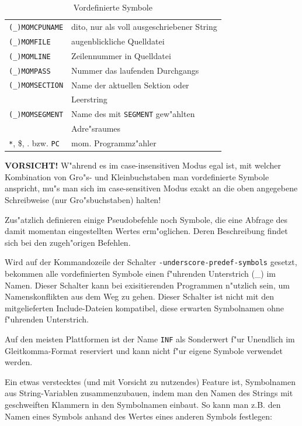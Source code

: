 \documentclass[12pt,a4paper,twoside]{report}
\newcommand{\bb}[1]{{\bf #1}}
\newcommand{\tty}[1]{{\tt #1}}
\newcommand{\predefsym}[1]{{\tt (\_)#1}}
\begin{document}
\begin{table}[p]
\begin{center}
\begin{tabular}{|l|l|}
\predefsym{MOMCPUNAME}   & dito, nur als voll ausgeschriebener String \\
\predefsym{MOMFILE}      & augenblickliche Quelldatei \\
\predefsym{MOMLINE}      & Zeilennummer in Quelldatei \\
\predefsym{MOMPASS}      & Nummer das laufenden Durchgangs \\
\predefsym{MOMSECTION}   & Name der aktuellen Sektion oder \\
                         & Leerstring \\
\predefsym{MOMSEGMENT}   & Name des mit \tty{SEGMENT} gew"ahlten \\
                         & Adre"sraumes \\
\verb!*!, \$, . bzw. \tty{PC} & mom. Programmz"ahler \\
\hline
\end{tabular}\end{center}
\caption{Vordefinierte Symbole\label{TabPredefined}}
\end{table}
\bb{VORSICHT!}  W"ahrend es im case-insensitiven Modus egal ist,
mit welcher Kombination von Gro"s- und Kleinbuchstaben man
vordefinierte Symbole anspricht, mu"s man sich im case-sensitiven
Modus exakt an die oben angegebene Schreibweise (nur Gro"sbuchstaben)
halten!
\par
Zus"atzlich definieren einige Pseudobefehle noch Symbole, die eine
Abfrage des damit momentan eingestellten Wertes erm"oglichen.  Deren
Beschreibung findet sich bei den zugeh"origen Befehlen.
\par
Wird auf der Kommandozeile der Schalter \tty{-underscore-predef-symbols}
gesetzt, bekommen alle vordefinierten Symbole einen f"uhrenden
Unterstrich (\_) im Namen.  Dieser Schalter kann bei exisitierenden
Programmen n"utzlich sein, um Namenskonflikten aus dem Weg zu gehen.
Dieser Schalter ist nicht mit den mitgelieferten Include-Dateien
kompatibel, diese erwarten Symbolnamen ohne f"uhrenden Unterstrich.
\par
Auf den meisten Plattformen ist der Name {\tt INF} als Sonderwert
f"ur Unendlich im Gleitkomma-Format reserviert und kann nicht
f"ur eigene Symbole verwendet werden.
\par
Ein etwas verstecktes (und mit Vorsicht zu nutzendes) Feature ist,
Symbolnamen aus String-Variablen zusammenzubauen, indem man den
Namen des Strings mit geschweiften Klammern in den Symbolnamen
einbaut.  So kann man z.B. den Namen eines Symbols anhand des
Wertes eines anderen Symbols festlegen:
\end{document}
